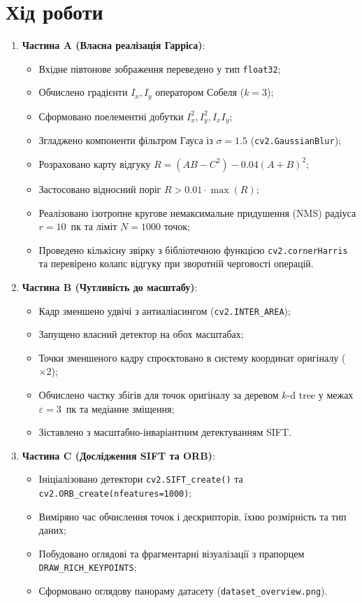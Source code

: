 \documentclass[14pt, a4paper]{extarticle}
\begin{document}
\section{Хід роботи}
\begin{enumerate}
    \item \textbf{Частина A (Власна реалізація Гарріса)}:
    \begin{itemize}
        \item Вхідне півтонове зображення переведено у тип \texttt{float32};
        \item Обчислено градієнти $I_x, I_y$ оператором Собеля ($k=3$);
        \item Сформовано поелементні добутки $I_x^2, I_y^2, I_x I_y$;
        \item Згладжено компоненти фільтром Гауса із $\sigma = 1.5$ (\texttt{cv2.GaussianBlur});
        \item Розраховано карту відгуку $R = (A B - C^2) - 0.04 (A + B)^2$;
        \item Застосовано відносний поріг $R > 0.01 \cdot \max(R)$;
        \item Реалізовано ізотропне кругове немаксимальне придушення (NMS) радіуса $r = 10$~пк та ліміт $N = 1000$ точок;
        \item Проведено кількісну звірку з бібліотечною функцією \texttt{cv2.cornerHarris} та перевірено колапс відгуку при зворотній черговості операцій.
    \end{itemize}

    \item \textbf{Частина B (Чутливість до масштабу)}:
    \begin{itemize}
        \item Кадр зменшено удвічі з антиаліасингом (\texttt{cv2.INTER\_AREA});
        \item Запущено власний детектор на обох масштабах;
        \item Точки зменшеного кадру спроєктовано в систему координат оригіналу ($\times 2$);
        \item Обчислено частку збігів для точок оригіналу за деревом $k$-d tree у межах $\varepsilon = 3$~пк та медіанне зміщення;
        \item Зіставлено з масштабно-інваріантним детектуванням SIFT.
    \end{itemize}

    \item \textbf{Частина C (Дослідження SIFT та ORB)}:
    \begin{itemize}
        \item Ініціалізовано детектори \texttt{cv2.SIFT\_create()} та \texttt{cv2.ORB\_create(nfeatures=1000)};
        \item Виміряно час обчислення точок і дескрипторів, їхню розмірність та тип даних;
        \item Побудовано оглядові та фрагментарні візуалізації з прапорцем \texttt{DRAW\_RICH\_KEYPOINTS};
        \item Сформовано оглядову панораму датасету (\texttt{dataset\_overview.png}).
    \end{itemize}


\end{enumerate}
\end{document}
